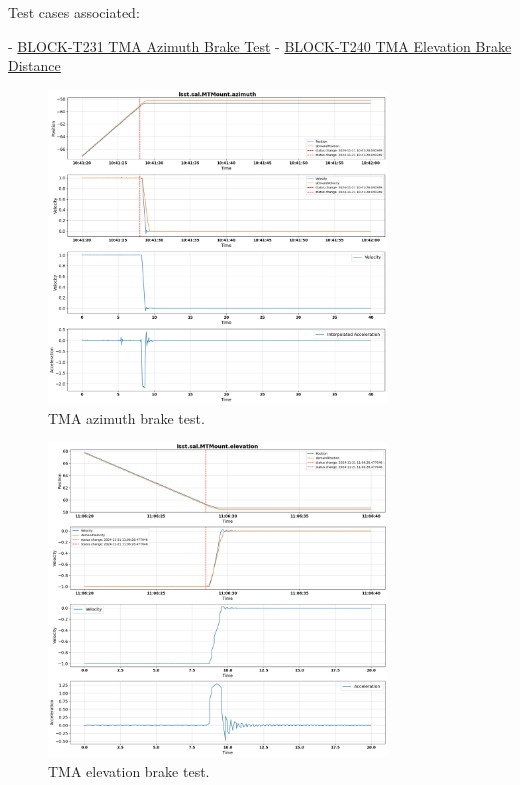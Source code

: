 Test cases associated:
\begin{itemize}
    - \href{https://rubinobs.atlassian.net/projects/BLOCK?selectedItem=com.atlassian.plugins.atlassian-connect-plugin:com.kanoah.test-manager__main-project-page#!/v2/testCase/BLOCK-T231}{BLOCK-T231 TMA Azimuth Brake Test}
    - \href{https://rubinobs.atlassian.net/projects/BLOCK?selectedItem=com.atlassian.plugins.atlassian-connect-plugin:com.kanoah.test-manager__main-project-page#!/v2/testCase/BLOCK-T240}{BLOCK-T240 TMA Elevation Brake Distance}
\end{itemize}

\begin{figure}
    \centering
    \includegraphics[width=0.8\textwidth]{spa/TMA_Az_brake_test_10.png}
    \caption{TMA azimuth brake test.}
    \label{fig:tma_azimuth_brake}
    \end{figure}

\begin{figure}
    \centering
    \includegraphics[width=0.8\textwidth]{spa/TMA_El_brake_test_10.png}
    \caption{TMA elevation brake test.}
    \label{fig:tma_elevation_brake}
    \end{figure}

